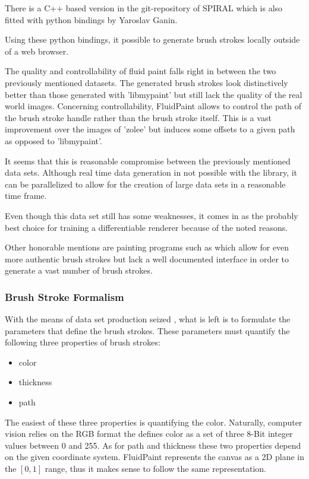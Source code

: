 There is a C++ based version in the git-repository of SPIRAL which is also fitted with
python bindings by Yaroslav Ganin.

Using these python bindings, it possible to generate brush strokes locally outside
of a web browser.

The quality and controllability of fluid paint falls right in between the two previously
mentioned datasets.
The generated brush strokes look distinctively better than those generated with 'libmypaint'
but still lack the quality of the real world images.
Concerning controllability, FluidPaint allows to control the path of the brush stroke
handle rather than the brush stroke itself.
This is a vast improvement over the images of 'zolee' but induces some offsets to
a given path as opposed to 'libmypaint'.

It seems that this is reasonable compromise between the previously mentioned data sets.
Although real time data generation in not possible with the library, it can be parallelized
to allow for the creation of large data sets in a reasonable time frame.

Even though this data set still has some weaknesses, it comes in as the probably best
choice for training a differentiable renderer because of the noted reasons.


Other honorable mentions are painting programs such as 
which allow for even more authentic brush strokes but lack a well documented interface
in order to generate a vast number of brush strokes.



\subsubsection{Brush Stroke Formalism}
With the means of data set production seized , what is left
is to formulate the parameters that define the brush strokes.
These parameters must quantify the following three properties of brush strokes:
\begin{itemize}
    \item color
    \item thickness
    \item path
\end{itemize}

The easiest of these three properties is quantifying the color.
Naturally, computer vision relies on the RGB format the defines color as a set of
three 8-Bit integer values between 0 and 255. 
As for path and thickness these two properties depend on the given coordinate system.
FluidPaint represents the canvas as a 2D plane in the $[0, 1]$ range, thus it makes
sense to follow the same representation.

